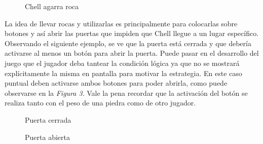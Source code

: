 \documentclass[a4paper]{article}
\begin{document}
\begin{figure}[!h]
	\caption{Chell agarra roca}
	\label{fig:diagrama1}
\end{figure}

La idea de llevar rocas y utilizarlas es principalmente para colocarlas sobre botones y así abrir las puertas que impiden que Chell llegue a un lugar específico. Observando el siguiente ejemplo, se ve que la puerta está cerrada y que debería activarse al menos un botón para abrir la puerta. Puede pasar en el desarrollo del juego que el jugador deba tantear la condición lógica ya que no se mostrará explícitamente la misma en pantalla para motivar la estrategia. En este caso puntual deben activarse ambos botones para poder abrirla, como puede observarse en la \textit{Figura 3}. Vale la pena recordar que la activación del botón se realiza tanto con el peso de una piedra como de otro jugador.

\begin{figure}[!h]
	\caption{Puerta cerrada}
	\label{fig:diagrama2}
\end{figure}


\begin{figure}[!h]
	\caption{Puerta abierta}
	\label{fig:diagrama3}
\end{figure}
\end{document}
